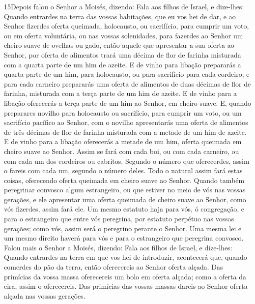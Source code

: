 \lettrine{15} Depois falou o Senhor a Moisés, dizendo:
Fala aos filhos de Israel, e dize-lhes: Quando entrardes na
terra das vossas habitações, que eu vos hei de dar, e ao Senhor
fizerdes oferta queimada, holocausto, ou sacrifício, para cumprir um
voto, ou em oferta voluntária, ou nas vossas solenidades, para
fazerdes ao Senhor um cheiro suave de ovelhas ou gado, então
aquele que apresentar a sua oferta ao Senhor, por oferta de
alimentos trará uma décima de flor de farinha misturada com a quarta
parte de um him de azeite. E de vinho para libação prepararás a
quarta parte de um him, para holocausto, ou para sacrifício para
cada cordeiro; e para cada carneiro prepararás uma oferta de
alimentos de duas décimas de flor de farinha, misturada com a terça
parte de um him de azeite. E de vinho para a libação oferecerás
a terça parte de um him ao Senhor, em cheiro suave. E, quando
preparares novilho para holocausto ou sacrifício, para cumprir um
voto, ou um sacrifício pacífico ao Senhor, com o novilho
apresentarás uma oferta de alimentos de três décimas de flor de
farinha misturada com a metade de um him de azeite. E de
vinho para a libação oferecerás a metade de um him, oferta queimada
em cheiro suave ao Senhor. Assim se fará com cada boi, ou com
cada carneiro, ou com cada um dos cordeiros ou cabritos.
Segundo o número que oferecerdes, assim o fareis com cada um,
segundo o número deles. Todo o natural assim fará estas
coisas, oferecendo oferta queimada em cheiro suave ao Senhor.
Quando também peregrinar convosco algum estrangeiro, ou que
estiver no meio de vós nas vossas gerações, e ele apresentar uma
oferta queimada de cheiro suave ao Senhor, como vós fizerdes, assim
fará ele. Um mesmo estatuto haja para vós, ó congregação, e
para o estrangeiro que entre vós peregrina, por estatuto perpétuo
nas vossas gerações; como vós, assim será o peregrino perante o
Senhor. Uma mesma lei e um mesmo direito haverá para vós e
para o estrangeiro que peregrina convosco. Falou mais o
Senhor a Moisés, dizendo: Fala aos filhos de Israel, e
dize-lhes: Quando entrardes na terra em que vos hei de introduzir,
acontecerá que, quando comerdes do pão da terra, então
oferecereis ao Senhor oferta alçada. Das primícias da vossa
massa oferecereis um bolo em oferta alçada; como a oferta da eira,
assim o oferecereis. Das primícias das vossas massas dareis
ao Senhor oferta alçada nas vossas gerações.

